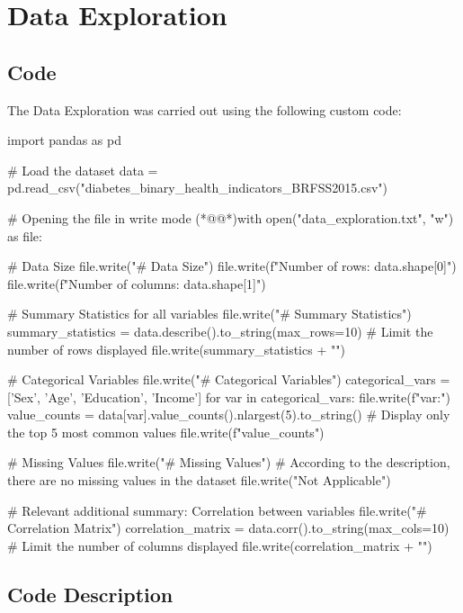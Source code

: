 \documentclass[11pt]{article}
\begin{document}
\section{Data Exploration}
\subsection{{Code}}
The Data Exploration was carried out using the following custom code:

\begin{python}

import pandas as pd

# Load the dataset
data = pd.read_csv("diabetes_binary_health_indicators_BRFSS2015.csv")

# Opening the file in write mode
(*@@*)with open("data_exploration.txt", "w") as file:

    # Data Size
    file.write("# Data Size\n")
    file.write(f"Number of rows: {data.shape[0]}\n")
    file.write(f"Number of columns: {data.shape[1]}\n\n")
    
    # Summary Statistics for all variables
    file.write("# Summary Statistics\n")
    summary_statistics = data.describe().to_string(max_rows=10)  # Limit the number of rows displayed
    file.write(summary_statistics + "\n\n")

    # Categorical Variables
    file.write("# Categorical Variables\n")
    categorical_vars = ['Sex', 'Age', 'Education', 'Income']
    for var in categorical_vars:
        file.write(f"{var}:\n")
        value_counts = data[var].value_counts().nlargest(5).to_string()  # Display only the top 5 most common values
        file.write(f"{value_counts}\n\n")
   
    # Missing Values
    file.write("# Missing Values\n")
    # According to the description, there are no missing values in the dataset
    file.write("Not Applicable\n\n")

    # Relevant additional summary: Correlation between variables
    file.write("# Correlation Matrix\n")
    correlation_matrix = data.corr().to_string(max_cols=10)  # Limit the number of columns displayed
    file.write(correlation_matrix + "\n\n")


\end{python}

\subsection{Code Description}
\end{document}
